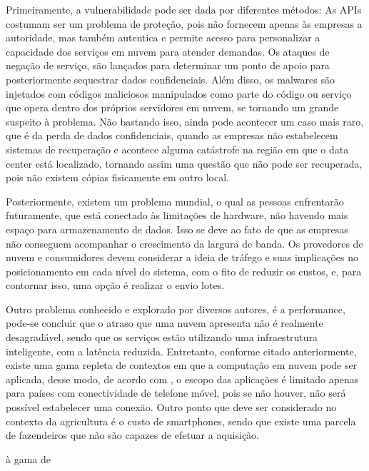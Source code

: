 \documentclass[12pt]{article}
\begin{document}
Primeiramente, a vulnerabilidade pode ser dada por diferentes métodos: As APIs costumam ser um problema de proteção, pois não fornecem apenas às empresas a autoridade, mas também autentica e permite acesso para personalizar a capacidade dos serviços em nuvem para atender demandas. Os ataques de negação de serviço, são lançados para determinar um ponto de apoio para posteriormente sequestrar dados confidenciais. Além disso, os malwares são injetados com códigos maliciosos manipulados como parte do código ou serviço que opera dentro dos próprios servidores em nuvem, se tornando um grande suspeito à problema. Não bastando isso, ainda pode acontecer um caso mais raro, que é da perda de dados confidenciais, quando as empresas não estabelecem sistemas de recuperação e acontece alguma catástrofe na região em que o data center está localizado, tornando assim uma questão que não pode ser recuperada, pois não existem cópias fisicamente em outro local.

Posteriormente, existem um problema mundial, o qual as pessoas enfrentarão futuramente, que está conectado às limitações de hardware, não havendo mais espaço para armazenamento de dados. Isso se deve ao fato de que as empresas não conseguem acompanhar o crescimento da largura de banda. Os provedores de nuvem e consumidores devem considerar a ideia de tráfego e suas implicações no posicionamento em cada nível do sistema, com o fito de reduzir os custos, e, para contornar isso, uma opção é realizar o envio lotes.

Outro problema conhecido e explorado por diversos autores, é a performance, pode-se concluir que o atraso que uma nuvem apresenta não é realmente desagradável, sendo que os serviços estão utilizando uma infraestrutura inteligente, com a latência reduzida. Entretanto, conforme citado anteriormente, existe uma gama repleta de contextos em que a computação em nuvem pode ser aplicada, desse modo, de acordo com \cite{prasad}, o escopo das aplicações é limitado apenas para países com conectividade de telefone móvel, pois se não houver, não será possível estabelecer uma conexão. Outro ponto que deve ser considerado no contexto da agricultura é o custo de smartphones, sendo que existe uma parcela de fazendeiros que não são capazes de efetuar a aquisição.

à gama de 
\nocite{*}
\medskip



\end{document}
